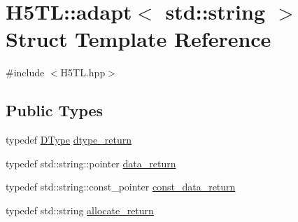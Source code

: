 \hypertarget{struct_h5_t_l_1_1adapt_3_01std_1_1string_01_4}{\section{H5\-T\-L\-:\-:adapt$<$ std\-:\-:string $>$ Struct Template Reference}
\label{struct_h5_t_l_1_1adapt_3_01std_1_1string_01_4}
}


{\ttfamily \#include $<$H5\-T\-L.\-hpp$>$}

\subsection*{Public Types}
\begin{DoxyCompactItemize}
\item 
typedef \hyperlink{class_h5_t_l_1_1_d_type}{D\-Type} \hyperlink{struct_h5_t_l_1_1adapt_3_01std_1_1string_01_4_a0118f83fcee595eab4291bbfc9e0b468}{dtype\-\_\-return}
\item 
typedef std\-::string\-::pointer \hyperlink{struct_h5_t_l_1_1adapt_3_01std_1_1string_01_4_ae65d6d1845858272965eb9df9e1391f7}{data\-\_\-return}
\item 
typedef std\-::string\-::const\-\_\-pointer \hyperlink{struct_h5_t_l_1_1adapt_3_01std_1_1string_01_4_a20cf03cb4783ce83295d1038409c6cee}{const\-\_\-data\-\_\-return}
\item 
typedef std\-::string \hyperlink{struct_h5_t_l_1_1adapt_3_01std_1_1string_01_4_ad34f256350ab9c209202b0cc0e84a8fd}{allocate\-\_\-return}
\end{DoxyCompactItemize}
